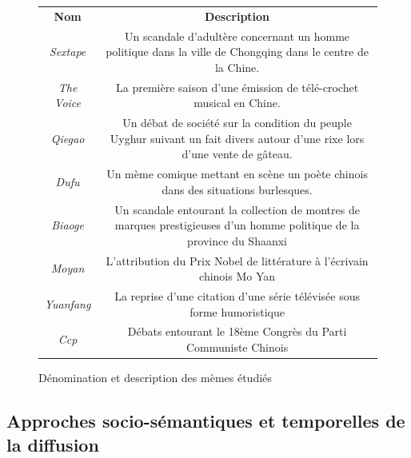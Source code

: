 \begin{figure}
  \begin{tabular}{c|c}

    \textbf{Nom} &
    \textbf{Description}\\

    \textit{S}\textit{extape}\textit{ } &
    Un scandale d{\textquoteright}adult\`ere concernant un homme politique
    dans la ville de Chongqing dans le centre de la Chine.\\

    \textit{The Voice } &
    La premi\`ere saison d{\textquoteright}une \'emission de
    t\'el\'e-crochet musical en Chine.\\

    \textit{Qiegao } &
    Un d\'ebat de soci\'et\'e sur la condition du peuple Uyghur suivant un
    fait divers autour d{\textquoteright}une rixe lors
    d{\textquoteright}une vente de g\^ateau.\\

    \textit{Dufu} &
    Un m\`eme comique mettant en sc\`ene un po\`ete chinois dans des
    situations burlesques.\\

    \textit{Biaoge} &
    Un scandale entourant la collection de montres de marques prestigieuses
    d{\textquoteright}un homme politique de la province du Shaanxi \\

    \textit{Moyan} &
    L{\textquoteright}attribution du Prix Nobel de litt\'erature \`a
    l{\textquoteright}\'ecrivain chinois Mo Yan\\

    \textit{Yuanfang} &
    La reprise d{\textquoteright}une citation d{\textquoteright}une s\'erie
    t\'el\'evis\'ee sous forme humoristique\\

    \textit{Ccp} &
    D\'ebats entourant le 18\`eme Congr\`es du Parti Communiste Chinois\\

  \end{tabular}
  \caption{D\'enomination et description des m\`emes \'etudi\'es}
\end{figure}


\subsection[Approches socio{}-s\'emantiques et temporelles de la diffusion]{Approches socio-s\'emantiques et temporelles de la diffusion}


